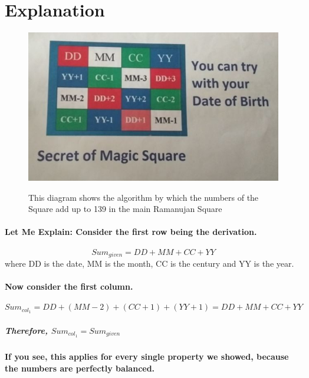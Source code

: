 \documentclass[a4paper,12pt,oneside]{book}
\begin{document}
\section{Explanation}
\begin{figure}[H]
\begin{center}
\includegraphics[scale = 1.0]{RamanujanSquare}
\cite{ramanujanSquare}
\caption{This diagram shows the algorithm by which the numbers of the Square add up to 139 in the main Ramanujan Square}
\end{center}
\end{figure}

\paragraph{
Let Me Explain: Consider the first row being the derivation.
}
\begin{equation*}
Sum_{given} = DD + MM + CC + YY
\end{equation*}
where DD is the date, MM is the month, CC is the century and YY is the year.

\paragraph{Now consider the first column.}
\begin{equation*}
Sum_{col_1} = DD + (MM-2) + (CC+1) + (YY+1) = DD + MM + CC + YY
\end{equation*}
\subparagraph{Therefore, $Sum_{col_1} = Sum_{given}$}

\paragraph{If you see, this applies for every single property we showed, because the numbers are perfectly balanced.}
\end{document}
